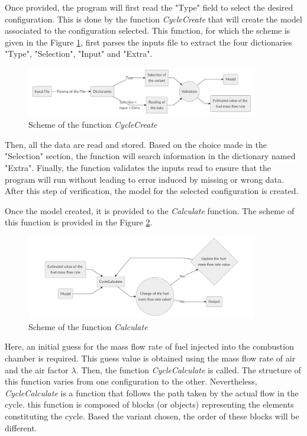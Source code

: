 Once provided, the program will first read the "Type" field to select the desired configuration. This is done by the function \textit{CycleCreate} that will create the model associated to the configuration selected. This function, for which the scheme is given in the Figure \ref{fig:C6_cyclecreate}, first parses the inputs file to extract the four dictionaries "Type", "Selection", "Input" and "Extra". 

\begin{figure}[h]
    \centering
    \includegraphics[width=0.9\textwidth]{Chapitre_6/Images/CycleCreate.png}
    \caption{Scheme of the function \textit{CycleCreate}}
    \label{fig:C6_cyclecreate}
\end{figure}
Then, all the data are read and stored. Based on the choice made in the "Selection" section, the function will search information in the dictionary named "Extra". 
Finally, the function validates the inputs read to ensure that the program will run without leading to error induced by missing or wrong data. After this step of verification, the model for the selected configuration is created.

Once the model created, it is provided to the \textit{Calculate} function. The scheme of this function is provided in the Figure \ref{fig:C6_calculate}.

\begin{figure}[h]
    \centering
    \includegraphics[width=0.9\textwidth]{Chapitre_6/Images/Calculate.png}
    \caption{Scheme of the function \textit{Calculate}}
    \label{fig:C6_calculate}
\end{figure}

Here, an initial guess for the mass flow rate of fuel injected into the combustion chamber is required. This guess value is obtained using the mass flow rate of air and the air factor $\lambda$. Then, the function \textit{CycleCalculate} is called. The structure of this function varies from one configuration to the other. Nevertheless, \textit{CycleCalculate} is a function that follows the path taken by the actual flow in the cycle. this function is composed of blocks (or objects) representing the elements constituting the cycle. Based the variant chosen, the order of these blocks will be different.  


